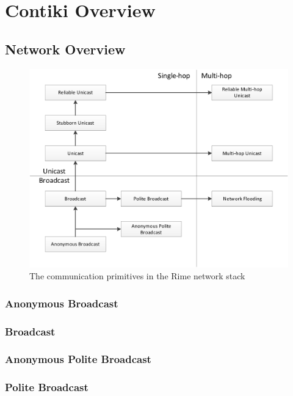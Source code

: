 \section{Contiki Overview}

\subsection{Network Overview}

\begin{figure}[H]
	\centering
	\includegraphics[width=\textwidth]{Diagrams/rime-stack}
	\caption{The communication primitives in the Rime network stack \cite{Dunkels:2007:ACA:1322263.1322295}}
\end{figure}

\subsubsection{Anonymous Broadcast}

\subsubsection{Broadcast}

\subsubsection{Anonymous Polite Broadcast}

\subsubsection{Polite Broadcast}

